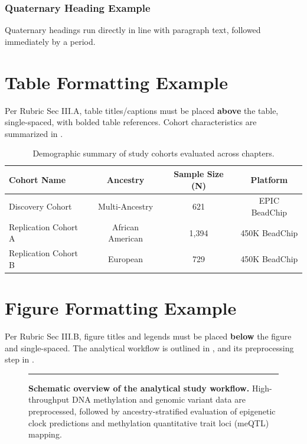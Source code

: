 \subsubsection{Quaternary Heading Example}
Quaternary headings run directly in line with paragraph text, followed immediately by a period.

\section{Table Formatting Example}
Per Rubric Sec III.A, table titles/captions must be placed \textbf{above} the table, single-spaced, with bolded table references. Cohort characteristics are summarized in .

\begin{table}[htb]
  \centering
  \caption[Sample demographic summary table.]{Demographic summary of study cohorts evaluated across chapters.}
  \label{tab:demographics}
  \begin{tabular}{lccc}
    \toprule
    \textbf{Cohort Name} & \textbf{Ancestry} & \textbf{Sample Size (N)} & \textbf{Platform} \\
    \midrule
    Discovery Cohort     & Multi-Ancestry    & 621                      & EPIC BeadChip \\
    Replication Cohort A & African American  & 1,394                    & 450K BeadChip \\
    Replication Cohort B & European          & 729                      & 450K BeadChip \\
    \bottomrule
  \end{tabular}
\end{table}

\section{Figure Formatting Example}
Per Rubric Sec III.B, figure titles and legends must be placed \textbf{below} the figure and single-spaced. The analytical workflow is outlined in , and its preprocessing step in .

\begin{figure}[htb]
  \centering
  \rule{0.8\linewidth}{2in} %
  \caption[Schematic overview of the analytical study workflow.]{
    \textbf{Schematic overview of the analytical study workflow.}
    High-throughput DNA methylation and genomic variant data are preprocessed, followed by ancestry-stratified evaluation of epigenetic clock predictions and methylation quantitative trait loci (meQTL) mapping.
  }
  \label{fig:workflow}
\end{figure}

